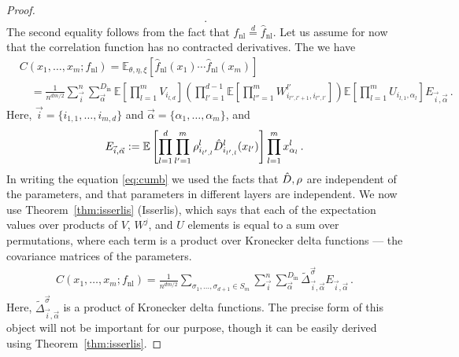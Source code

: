 \documentclass[english]{article}
\newcommand{\Din}{\ensuremath{D_{\mathrm{in}}}}
\newcommand{\fnl}{f_{\mathrm{nl}}}
\newcommand{\hfnl}{\hat{f}_{\mathrm{nl}}}
\newcommand{\lexp}{\mathbb{E}\left[}
\newcommand{\lexpp}[1]{\mathbb{E}_{#1}\left[}
\newcommand{\rexp}{\right]}
\begin{document}
\begin{proof}
\begin{align}
    \label{eq:fnlhfnl} \,. 
  \end{align}
  The second equality follows from the fact that $\fnl \overset{d}{=} \hfnl$.
  Let us assume for now that the correlation function has no contracted derivatives.
  The we have
  \begin{align}
    &C(x_1,\dots,x_m;\fnl) = \lexpp{\theta,\eta,\xi} \hfnl(x_1) \cdots \hfnl(x_m) \rexp
    \\ &\quad =
         \frac{1}{n^{dm/2}}
         \sum_{\vec{i}}^n \sum_{\vec{\alpha}}^{\Din}
         \lexp \prod_{l=1}^m V_{i_{l,d}} \rexp
         \left( \prod_{l'=1}^{d-1} \lexp \prod_{l''=1}^m W^{l'}_{i_{l'',l'+1},i_{l'',l'}} \rexp \right)
         \lexp \prod_{l=1}^m U_{i_{l,1},\alpha_l} \rexp E_{\vec{i},\vec{\alpha}} \,.
         \label{eq:cumb}
  \end{align}
  Here, $\vec{i} = \{i_{1,1},\dots,i_{m,d}\}$ and $\vec{\alpha} = \{\alpha_1,\dots,\alpha_m\}$, and
  \begin{align}
    E_{\vec{i},\vec{\alpha}} := 
    \lexp \prod_{l=1}^d \prod_{l'=1}^m \rho^l_{i_{l',l}} \hD^l_{i_{l',l}}(x_{l'}) \rexp
    \prod_{l=1}^m x^l_{\alpha_l} \,.
  \end{align}
  In writing the equation \eqref{eq:cumb} we used the facts that $\hat{D},\rho$ are independent of the parameters, and that parameters in different layers are independent.
  We now use Theorem~\ref{thm:isserlis} (Isserlis), which says that each of the expectation values over products of $V$, $W^j$, and $U$ elements is equal to a sum over permutations, where each term is a product over Kronecker delta functions --- the covariance matrices of the parameters.
  \begin{align}
    C(x_1,\dots,x_m;\fnl) = \frac{1}{n^{dm/2}}
      \sum_{\sigma_1,\dots,\sigma_{d+1} \in S_m}
      \sum_{\vec{i}}^n \sum_{\vec{\alpha}}^{\Din} \tilde{\Delta}^{\vec{\sigma}}_{\vec{i},\vec{\alpha}} E_{\vec{i},\vec{\alpha}}
    \,. \label{eq:permsum}
  \end{align}
  Here, $\tilde{\Delta}^{\vec{\sigma}}_{\vec{i},\vec{\alpha}}$ is a product of Kronecker delta functions.
  The precise form of this object will not be important for our purpose, though it can be easily derived using Theorem~\ref{thm:isserlis}.


\end{proof}
\end{document}
